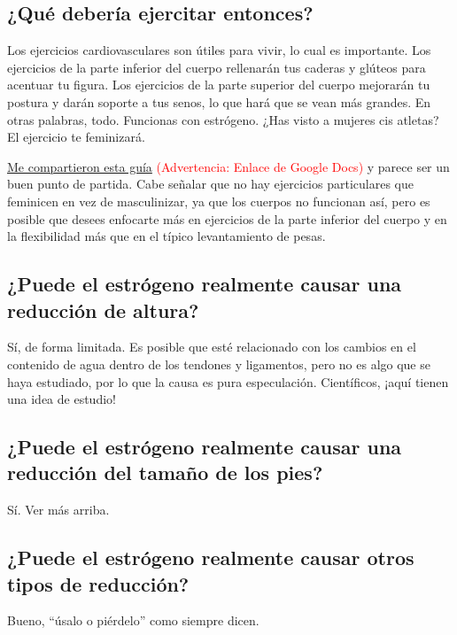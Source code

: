 \documentclass{article}
\begin{document}
\subsection{¿Qué debería ejercitar entonces?}\label{11-16}

Los ejercicios cardiovasculares son útiles para vivir, lo cual es importante. Los ejercicios de la parte inferior del cuerpo rellenarán tus caderas y glúteos para acentuar tu figura. Los ejercicios de la parte superior del cuerpo mejorarán tu postura y darán soporte a tus senos, lo que hará que se vean más grandes. En otras palabras, todo. Funcionas con estrógeno. ¿Has visto a mujeres cis atletas? El ejercicio te feminizará.

\href{https://docs.google.com/document/d/1-NyE5EY5TTaRRMhk7HlTbKJ7HifjEsA4jlDO1qKQVl0/edit?tab=t.0}{Me compartieron esta guía} \textcolor{red}{(Advertencia: Enlace de Google Docs)} y parece ser un buen punto de partida. Cabe señalar que no hay ejercicios particulares que feminicen en vez de masculinizar, ya que los cuerpos no funcionan así, pero es posible que desees enfocarte más en ejercicios de la parte inferior del cuerpo y en la flexibilidad más que en el típico levantamiento de pesas.

\subsection{¿Puede el estrógeno realmente causar una reducción de altura?}

Sí, de forma limitada. Es posible que esté relacionado con los cambios en el contenido de agua dentro de los tendones y ligamentos, pero no es algo que se haya estudiado, por lo que la causa es pura especulación. Científicos, ¡aquí tienen una idea de estudio!

\subsection{¿Puede el estrógeno realmente causar una reducción del tamaño de los pies?}

Sí. Ver más arriba.

\subsection{¿Puede el estrógeno realmente causar otros tipos de reducción?}\label{11-19}

Bueno, “úsalo o piérdelo” como siempre dicen.
\end{document}
